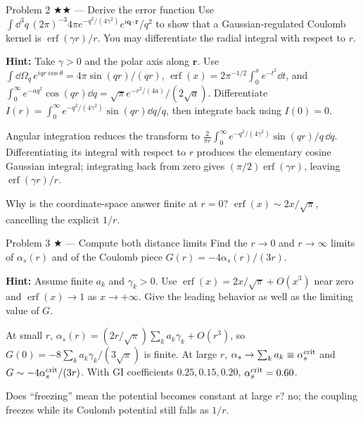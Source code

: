 \documentclass[11pt]{article}
\begin{document}
\begin{problem}{Problem 2 ★★ — Derive the error function}
Use
$\int \dd^3q\,(2\pi)^{-3}4\pi e^{-q^2/(4\gamma^2)}e^{i\bm q\cdot\bm r}/q^2$
to show that a Gaussian-regulated Coulomb kernel is
$\operatorname{erf}(\gamma r)/r$. You may differentiate the radial integral
with respect to $r$.

\textbf{Hint:} Take $\gamma>0$ and the polar axis along $\bm r$.
Use $\int\dd\Omega_q\,e^{iqr\cos\theta}=4\pi\sin(qr)/(qr)$,
$\operatorname{erf}(x)=2\pi^{-1/2}\int_0^x e^{-t^2}\dd t$, and
$\int_0^\infty e^{-aq^2}\cos(qr)\dd q=\sqrt\pi e^{-r^2/(4a)}/(2\sqrt a)$.
Differentiate $I(r)=\int_0^\infty e^{-q^2/(4\gamma^2)}\sin(qr)\dd q/q$,
then integrate back using $I(0)=0$.
\end{problem}
\begin{solution}
Angular integration reduces the transform to
$\frac{2}{\pi r}\int_0^\infty e^{-q^2/(4\gamma^2)}\sin(qr)/q\,\dd q$.
Differentiating its integral with respect to $r$ produces the elementary cosine
Gaussian integral; integrating back from zero gives
$(\pi/2)\operatorname{erf}(\gamma r)$, leaving
$\operatorname{erf}(\gamma r)/r$.
\end{solution}
\begin{quiz}
Why is the coordinate-space answer finite at $r=0$? \answer
$\operatorname{erf}(x)\sim2x/\sqrt\pi$, cancelling the explicit $1/r$.
\end{quiz}

\begin{problem}{Problem 3 ★ — Compute both distance limits}
Find the $r\to0$ and $r\to\infty$ limits of $\alpha_s(r)$ and of the Coulomb
piece $G(r)=-4\alpha_s(r)/(3r)$.

\textbf{Hint:} Assume finite $a_k$ and $\gamma_k>0$.
Use $\operatorname{erf}(x)=2x/\sqrt\pi+O(x^3)$ near zero and
$\operatorname{erf}(x)\to1$ as $x\to+\infty$. Give the leading behavior
as well as the limiting value of $G$.
\end{problem}
\begin{solution}
At small $r$,
$\alpha_s(r)=(2r/\sqrt\pi)\sum_k a_k\gamma_k+O(r^3)$, so
$G(0)=-8\sum_k a_k\gamma_k/(3\sqrt\pi)$ is finite. At large $r$,
$\alpha_s\to\sum_k a_k\equiv\alpha_s^{\rm crit}$ and
$G\sim-4\alpha_s^{\rm crit}/(3r)$. With GI coefficients $0.25,0.15,0.20$,
$\alpha_s^{\rm crit}=0.60$.
\end{solution}
\begin{quiz}
Does “freezing” mean the potential becomes constant at large $r$? \answer no;
the coupling freezes while its Coulomb potential still falls as $1/r$.
\end{quiz}
\end{document}
